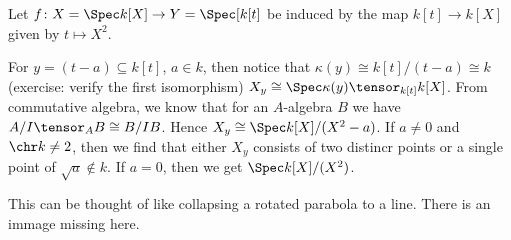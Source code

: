 Let $f\colon X = \Spec k[X]\to Y = \Spec[k[t]$ be induced by the map
 $k[t] \to k[X]$ given by $t\mapsto X^2$.

For $y  = (t-a) \subseteq k[t]$, $a \in k$, then notice that $\kappa(y) \cong k[t]/(t-a) \cong k$
(exercise: verify the first isomorphism)
$X_y \cong \Spec \kappa(y)\tensor_{k[t]} k[X]$. From commutative algebra, we know
that for an  $A$-algebra $B$ we have $A/I \tensor_A B\cong B/{IB}$.
Hence $X_y \cong \Spec k[X]/(X^2-a)$. If $a\neq 0$ and $\chr k\neq 2$, then we
find that either $X_y$ consists of two distincr points or a single point
of $\sqrt{a} \notin k$. If $a = 0$, then we get $\Spec k[X]/(X^2)$.

This can be thought of like collapsing a rotated parabola to a line. There
is an immage missing here.
